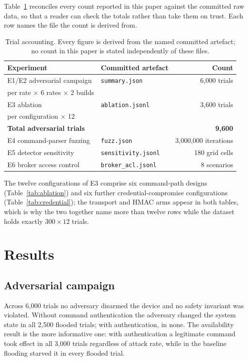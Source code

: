 Table~\ref{tab:accounting} reconciles every count reported in this paper against the committed
raw data, so that a reader can check the totals rather than take them on trust. Each row names
the file the count is derived from.

\begin{table}[htbp]
\centering\small
\caption{Trial accounting. Every figure is derived from the named committed artefact; no count
in this paper is stated independently of these files.}
\label{tab:accounting}
\begin{tabular}{@{}llr@{}}
\toprule
Experiment & Committed artefact & Count \\
\midrule
E1/E2 adversarial campaign & \texttt{summary.json} & 6{,}000 trials \\
\quad 500 per rate $\times$ 6 rates $\times$ 2 builds & & \\
E3 ablation & \texttt{ablation.jsonl} & 3{,}600 trials \\
\quad 300 per configuration $\times$ 12 & & \\
\midrule
\textbf{Total adversarial trials} & & \textbf{9{,}600} \\
\midrule
E4 command-parser fuzzing & \texttt{fuzz.json} & 3{,}000{,}000 iterations \\
E5 detector sensitivity & \texttt{sensitivity.jsonl} & 180 grid cells \\
E6 broker access control & \texttt{broker\_acl.jsonl} & 8 scenarios \\
\bottomrule
\end{tabular}
\end{table}

The twelve configurations of E3 comprise six command-path designs (Table~\ref{tab:ablation})
and six further credential-compromise configurations (Table~\ref{tab:credential}); the
transport and HMAC arms appear in both tables, which is why the two together name more than
twelve rows while the dataset holds exactly $300 \times 12$ trials.

\section{Results}\label{sec:results}

\subsection{Adversarial campaign}

Across 6{,}000 trials no adversary disarmed the device and no safety invariant was violated.
Without command authentication the adversary changed the system state in all 2{,}500 flooded
trials; with authentication, in none. The availability result is the more informative one: with
authentication a legitimate command took effect in all 3{,}000 trials regardless of attack rate,
while in the baseline flooding starved it in every flooded trial.

